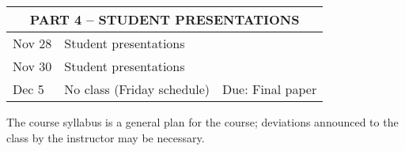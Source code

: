 \documentclass[12pt]{article}
\begin{document}
\begin{center}
\begin{tabular}[c]{lll}
\hline
           \multicolumn{3}{c}{PART 4 -- STUDENT PRESENTATIONS}                                                    \\
\hline
Nov 28     & Student presentations                        &                                                       \\
Nov 30     & Student presentations                        &                                                       \\
\hline
Dec 5      & No class (Friday schedule)                   & Due: Final paper                                      \\
\hline \hline
\end{tabular}
\end{center}

The course syllabus is a general plan for the course; deviations announced to the class by the instructor may be necessary.
\end{document}
